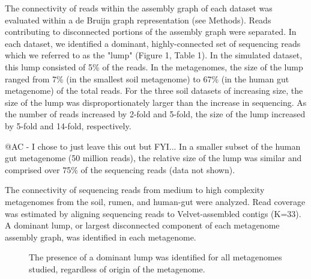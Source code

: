 \documentclass[11pt]{article} %
\begin{document}
The connectivity of reads within the assembly graph of each dataset was evaluated within a de Bruijn graph representation (see Methods).  Reads contributing to disconnected portions of the assembly graph were separated.  In each dataset, we identified a dominant, highly-connected set of sequencing reads which we referred to as the "lump" (Figure 1, Table 1).  In the simulated dataset, this lump consisted of 5\% of the reads.  In the metagenomes, the size of the lump ranged from 7\% (in the smallest soil metagenome) to 67\% (in the human gut metagenome) of the total reads.  For the three soil datasets of increasing size, the size of the lump was disproportionately larger than the increase in sequencing.  As the number of reads increased by 2-fold and 5-fold, the size of the lump increased by 5-fold and 14-fold, respectively.  

@AC - I chose to just leave this out but FYI...  In a smaller subset of the human gut metagenome (50 million reads), the relative size of the lump was similar and comprised over 75\% of the sequencing reads (data not shown). 

\begin{table}
\caption{The connectivity of sequencing reads from medium to high complexity metagenomes from the soil, rumen, and human-gut were analyzed.  Read coverage was estimated by aligning sequencing reads to Velvet-assembled contigs (K=33).  A dominant lump, or largest disconnected component of each metagenome assembly graph, was identified in each metagenome. }
\end{table}

\begin{figure}
\caption{The presence of a dominant lump was identified for all metagenomes studied, regardless of origin of the metagenome.}
\end{figure}
\end{document}
